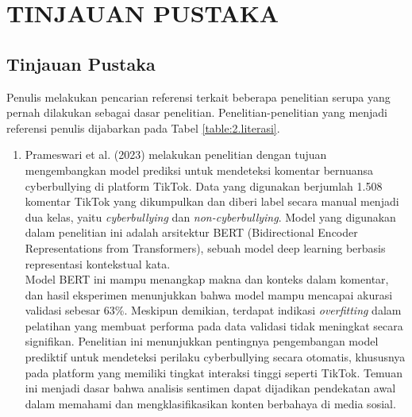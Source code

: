 \newpage
\chapter{TINJAUAN PUSTAKA} \label{Bab II}

\section{Tinjauan Pustaka} \label{II.Tinjauan}

Penulis  melakukan  pencarian  referensi  terkait beberapa penelitian serupa yang pernah dilakukan sebagai dasar penelitian. Penelitian-penelitian yang menjadi referensi penulis dijabarkan pada Tabel \ref{table:2.literasi}. \par

\begin{enumerate}
    \item Prameswari et al. (2023) melakukan penelitian dengan tujuan mengembangkan model prediksi untuk mendeteksi komentar bernuansa cyberbullying di platform TikTok. Data yang digunakan berjumlah 1.508 komentar TikTok yang dikumpulkan dan diberi label secara manual menjadi dua kelas, yaitu \textit{cyberbullying} dan \textit{non-cyberbullying}. Model yang digunakan dalam penelitian ini adalah arsitektur BERT (Bidirectional Encoder Representations from Transformers), sebuah model deep learning berbasis representasi kontekstual kata. \\
    Model BERT ini mampu menangkap makna dan konteks dalam komentar, dan hasil eksperimen menunjukkan bahwa model mampu mencapai akurasi validasi sebesar 63\%. Meskipun demikian, terdapat indikasi \textit{overfitting} dalam pelatihan yang membuat performa pada data validasi tidak meningkat secara signifikan. Penelitian ini menunjukkan pentingnya pengembangan model prediktif untuk mendeteksi perilaku cyberbullying secara otomatis, khususnya pada platform yang memiliki tingkat interaksi tinggi seperti TikTok. Temuan ini menjadi dasar bahwa analisis sentimen dapat dijadikan pendekatan awal dalam memahami dan mengklasifikasikan konten berbahaya di media sosial.


\end{enumerate}
